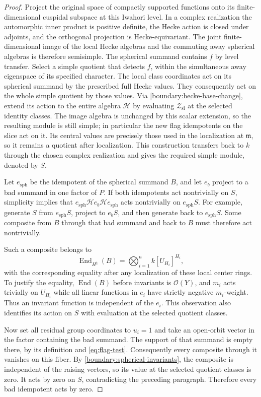 \documentclass[11pt]{article}
\numberwithin{equation}{section}
\theoremstyle{definition}
\theoremstyle{remark}
\newcommand{\cO}{\mathcal O}
\newcommand{\End}{\operatorname{End}}
\begin{document}
\begin{proof}
Project the original space of compactly supported functions onto its
finite-dimensional cuspidal subspace at this Iwahori level.  In a
complex realization the automorphic inner product is positive definite,
the Hecke action is closed under adjoints, and the orthogonal projection
is Hecke-equivariant.  The joint finite-dimensional image of the local
Hecke algebras and the commuting away spherical algebras is therefore
semisimple.  The spherical summand contains $f$ by level transfer.
Select a simple quotient that detects $f$, within the simultaneous
away eigenspace of its specified character.  The local class coordinates
act on its spherical summand by the prescribed full Hecke values.
They consequently act on the whole simple quotient by those values.
Via \eqref{boundary:hecke-base-change}, extend its action to the entire
algebra $\mathcal H$ by evaluating $\mathcal Z_{\mathrm{sl}}$ at the
selected identity classes.  The image algebra is unchanged by this
scalar extension, so the resulting module is still simple; in
particular the new flag idempotents on the slice act on it.  Its
central values are precisely those used in the localization at
$\mathfrak m$, so it remains a quotient after localization.  This
construction transfers back to $k$ through the chosen complex
realization and gives the required simple module, denoted by $S$.

Let $e_{\mathrm{sph}}$ be the idempotent of the spherical summand $B$,
and let $e_b$ project to a bad summand in one factor of $P$.  If both
idempotents act nontrivially on $S$, simplicity implies that
$e_{\mathrm{sph}}\mathcal H e_b\mathcal H e_{\mathrm{sph}}$ acts nontrivially
on $e_{\mathrm{sph}}S$.  For example, generate $S$ from
$e_{\mathrm{sph}}S$, project to $e_bS$, and then generate back to
$e_{\mathrm{sph}}S$.  Some composite from $B$ through that bad summand
and back to $B$ must therefore act nontrivially.

Such a composite belongs to
\begin{equation}\label{boundary:spherical-invariants}
 \End_{H^\natural}(B)
      =\bigotimes_{i=1}^n k[U_{H_i}]^{H_i},
\end{equation}
with the corresponding equality after any localization of these local
center rings.  To justify the equality,
$\End(B)$ before invariants is $\cO(Y)$, and $m_i$ acts trivially on
$U_{H_i}$ while all linear functions in $e_i$ have strictly negative
$m_i$-weight.  Thus an invariant function is independent of the $e_i$.
This observation also identifies its action on $S$ with evaluation at
the selected quotient classes.

Now set all residual group coordinates to $u_i=1$ and take an open-orbit
vector in the factor containing the bad summand.  The support of that
summand is empty there, by its definition and
\eqref{eq:flag-test}.  Consequently every composite through it vanishes
on this fiber.  By \eqref{boundary:spherical-invariants}, the composite
is independent of the raising vectors, so its value at the selected
quotient classes is zero.  It acts by zero on $S$, contradicting the
preceding paragraph.  Therefore every bad idempotent acts by zero.
\end{proof}
\end{document}
